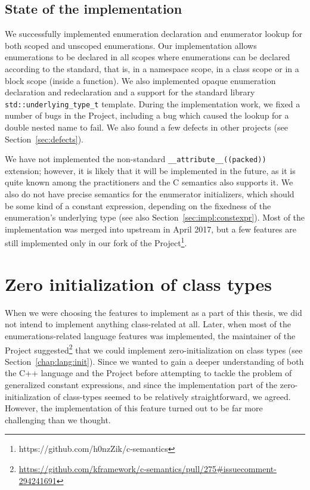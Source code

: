 \documentclass[nolot,nolof,nocover,printed]{fithesis3}
\newcommand{\Project}{Project\xspace}
\begin{document}

\subsection{State of the implementation}


We successfully implemented enumeration declaration and enumerator lookup for both scoped and unscoped enumerations. Our implementation allows enumerations to be declared in all scopes where enumerations can be declared according to the standard, that is, in a namespace scope, in a class scope or in a block scope (inside a function). We also implemented opaque enumeration declaration and redeclaration and a support for the standard library \lstinline|std::underlying_type_t| template. During the implementation work, we fixed a number of bugs in the \Project, including a bug which caused the lookup for a double nested name to fail. We also found a few defects in other projects (see Section~\ref{sec:defects}).

We have not implemented the non-standard \lstinline|__attribute__((packed))| extension; however, it is likely that it will be implemented in the future, as it is quite known among the practitioners and the C semantics also supports it. We also do not have precise semantics for the enumerator initializers, which should be some kind of a constant expression, depending on the fixedness of the enumeration's underlying type (see also Section~\ref{sec:impl:constexpr}). Most of the implementation was merged into upstream in April 2017, but a few features are still implemented only in our fork of the Project\footnote{https://github.com/h0nzZik/c-semantics}.

\section{Zero initialization of class types}\label{chp:implZeroInit}

When we were choosing the features to implement as a part of this thesis, we did not intend to implement anything class-related at all. Later, when most of the enumerations-related language features was implemented, the maintainer of the \Project suggested\footnote{\url{https://github.com/kframework/c-semantics/pull/275\#issuecomment-294241691}}
that we could implement zero-initialization on class types (see Section~\ref{chap:lang:init}). Since we wanted to gain a deeper understanding of both the C++ language and the \Project before attempting to tackle the problem of generalized constant expressions, and since the implementation part of the zero-initialization of class-types seemed to be relatively straightforward, we agreed. However, the implementation of this feature turned out to be far more challenging than we thought.
\end{document}
